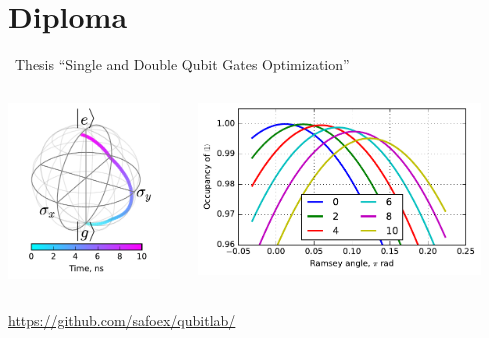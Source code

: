 \documentclass{beamer}
\begin{document}
\section{Diploma}
\begin{frame}{\quad \quad ~Thesis}
\centering
``Single and Double Qubit Gates Optimization''
\vskip 0.1cm
\begin{columns}
\begin{column}{0.49\textwidth}
\centering
\includegraphics[width = 0.9\textwidth]{Pictures/bloch_incorrect_sy.pdf}
\end{column}
\begin{column}{0.49\textwidth}
\centering
\includegraphics[width = 0.9\textwidth]{Pictures/APE_result_2.pdf}
\end{column}
\end{columns}
\vskip 0.1cm
\underline{https://github.com/safoex/qubitlab/}
\end{frame}
\end{document}
